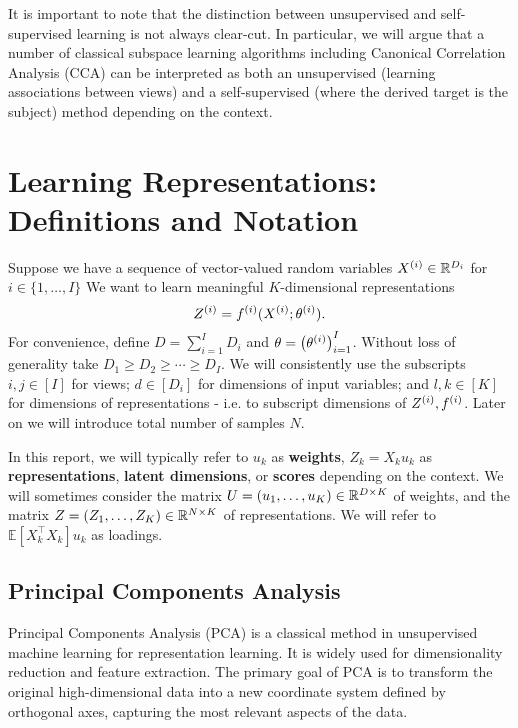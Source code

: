 It is important to note that the distinction between unsupervised and self-supervised learning is not always clear-cut.
In particular, we will argue that a number of classical subspace learning algorithms including Canonical Correlation
Analysis (CCA) can be interpreted as both an unsupervised (learning associations between views) and a self-supervised (where the derived target is the subject) method depending on the context.



\section{Learning Representations: Definitions and Notation}

Suppose we have a sequence of vector-valued random variables $X^{(i)} \in \mathbb{R}^{D_i}$ for $i \in \{1, \dots, I \}$
We want to learn meaningful $K$-dimensional representations
\begin{equation}\label{eq:general-form-of-representations}
    Z^{(i)} = f^{(i)}( X^{(i)}; \theta^{(i)}).
\end{equation}
For convenience, define $D = \sum_{i=1}^I D_i$ and $\theta = \left(\theta^{(i)}\right)_{i=1}^I$.
Without loss of generality take $D_1 \geq D_2 \geq \cdots \geq D_I$.
We will consistently use the subscripts $i,j \in [I]$ for views;
$d \in [D_i]$ for dimensions of input variables;
and $l,k \in [K]$ for dimensions of representations - i.e. to subscript dimensions of $Z^{(i)}, f^{(i)}$.
Later on we will introduce total number of samples $N$.

In this report, we will typically refer to $u_k$ as \textbf{weights}, $Z_k = X_k u_k$ as \textbf{representations},
        \textbf{latent
dimensions}, or \textbf{scores} depending on the context. We will sometimes consider the
        matrix $U = \left(u_1, \dots, u_K\right) \in \mathbb{R}^{D \times K}$ of weights, and the
        matrix $Z = \left(Z_1, \dots, Z_K\right) \in \mathbb{R}^{N \times K}$ of representations. We will refer to $\mathbb{E
        }[X_k^\top X_k] u_k$ as loadings.

\subsection{Principal Components Analysis}

Principal Components Analysis (PCA)\cite{hotelling1933analysis} is a classical method in unsupervised machine learning for representation learning.
It is widely used for dimensionality reduction and feature extraction.
The primary goal of PCA is to transform the original high-dimensional data into a new coordinate system defined by orthogonal axes, capturing the most relevant aspects of the data.

